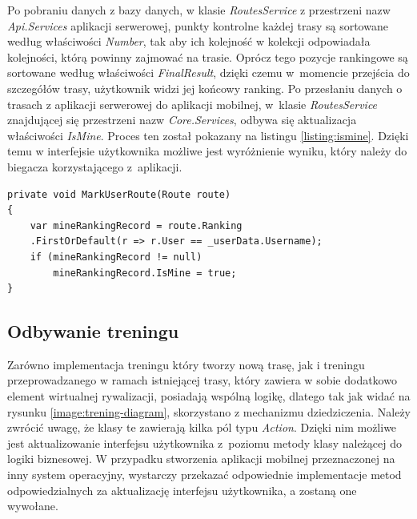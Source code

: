 Po pobraniu danych z bazy danych, w klasie \textit{RoutesService} z przestrzeni nazw \textit{Api.Services} aplikacji serwerowej, punkty kontrolne każdej trasy są sortowane według właściwości \textit{Number}, tak aby ich kolejność w kolekcji odpowiadała kolejności, którą powinny zajmować na trasie. Oprócz tego pozycje rankingowe są sortowane według właściwości \textit{FinalResult}, dzięki czemu w~momencie przejścia do szczegółów trasy, użytkownik widzi jej końcowy ranking. Po przesłaniu danych o trasach z aplikacji serwerowej do aplikacji mobilnej, w~klasie \textit{RoutesService} znajdującej się przestrzeni nazw \textit{Core.Services}, odbywa się aktualizacja właściwości \textit{IsMine}. Proces ten został pokazany na listingu \ref{listing:ismine}. Dzięki temu w interfejsie użytkownika możliwe jest wyróżnienie wyniku, który należy do biegacza korzystającego z~aplikacji.
\begin{lstlisting}[caption={Aktualizacja właściwości IsMine klasy Route},label=listing:ismine]
private void MarkUserRoute(Route route)
{
	var mineRankingRecord = route.Ranking
	.FirstOrDefault(r => r.User == _userData.Username);
	if (mineRankingRecord != null)
		mineRankingRecord.IsMine = true;
}
\end{lstlisting}

\subsection{Odbywanie treningu}\label{chap:trening}
Zarówno implementacja treningu który tworzy nową trasę, jak i treningu przeprowadzanego w ramach istniejącej trasy, który zawiera w sobie dodatkowo element wirtualnej rywalizacji, posiadają wspólną logikę, dlatego tak jak widać na rysunku \ref{image:trening-diagram}, skorzystano z mechanizmu dziedziczenia. Należy zwrócić uwagę, że klasy te zawierają kilka pól typu \textit{Action}. Dzięki nim możliwe jest aktualizowanie interfejsu użytkownika z~poziomu metody klasy należącej do logiki biznesowej. W przypadku stworzenia aplikacji mobilnej przeznaczonej na inny system operacyjny, wystarczy przekazać odpowiednie implementacje metod odpowiedzialnych za aktualizację interfejsu użytkownika, a zostaną one wywołane. 


